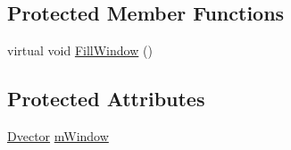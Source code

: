 \subsection*{Protected Member Functions}
\begin{DoxyCompactItemize}
\item 
virtual void \hyperlink{classtsa_1_1_base_window_aa74b29105d94caa521d308198e8e6643}{Fill\+Window} ()
\end{DoxyCompactItemize}
\subsection*{Protected Attributes}
\begin{DoxyCompactItemize}
\item 
\hyperlink{namespacetsa_a8900fb03d849baf447a1a0efe2561fb2}{Dvector} \hyperlink{classtsa_1_1_base_window_a182b397ac3f3c409bfcb3a39d9c1575a}{m\+Window}
\end{DoxyCompactItemize}
